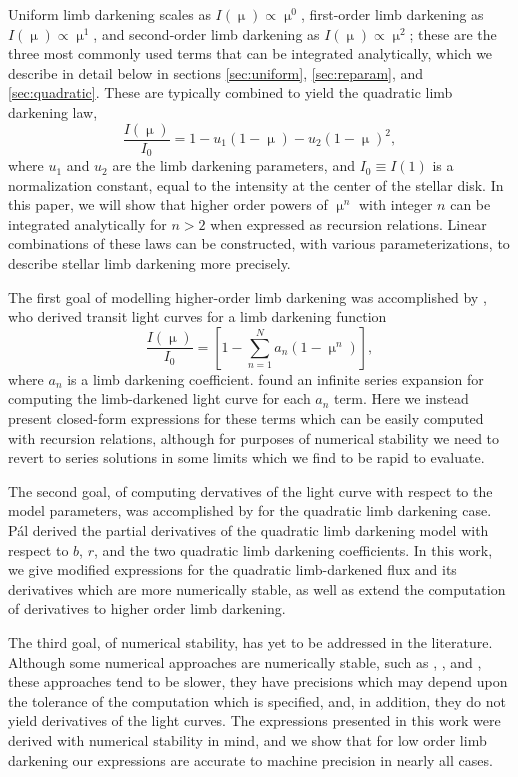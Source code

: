 \documentclass[modern]{aastex61}
\begin{document}
Uniform limb darkening scales as $I(\upmu) \propto \upmu^0$, first-order 
limb darkening as $I(\upmu) \propto \upmu^1$, and second-order limb darkening 
as $I(\upmu)\propto \upmu^2$; these are the three most commonly used  terms
that can be integrated analytically, which we describe in detail below 
in sections \ref{sec:uniform}, \ref{sec:reparam}, and \ref{sec:quadratic}.
These are typically combined to yield the quadratic limb darkening law,
%
\begin{equation} \label{eq:quadraticld}
    \frac{I(\upmu)}{I_0} = 1-u_1 (1-\upmu) - u_2 (1-\upmu)^2,
\end{equation}
%
where $u_1$ and $u_2$ are the limb darkening parameters, and
$I_0 \equiv I(1)$ is a normalization constant, equal to the 
intensity at the center of the stellar disk.
In this paper, we will show that higher order powers of $\upmu^n$ with integer
$n$ can be integrated analytically for $n > 2$ when expressed as recursion relations.
Linear combinations of these laws can be constructed,
with various parameterizations, to describe stellar limb darkening more precisely.

The first goal of modelling higher-order limb darkening was accomplished
by \citet{Gimenez2006}, who derived transit light curves for a limb darkening
function
%
\begin{equation} \label{eq:gimenez}
    \frac{I(\upmu)}{I_0} = \left[1-\sum_{n=1}^N a_n (1-\upmu^n) \right],
\end{equation}
%
where $a_n$ is a limb darkening coefficient.  \cite{Gimenez2006}
found an infinite series expansion for computing the limb-darkened light curve
for each $a_n$ term.  Here we instead present closed-form expressions for these terms
which can be easily computed with recursion relations, although for purposes
of numerical stability we need to revert to series solutions in some limits
which we find to be rapid to evaluate.

The second goal, of computing dervatives of the light curve with respect to
the model parameters, was accomplished by \cite{Pal2008} for the quadratic
limb darkening case.  P\'al derived the partial derivatives of the quadratic
limb darkening model with respect to $b$, $r$, and the two quadratic
limb darkening coefficients. In this work, we give modified expressions
for the quadratic limb-darkened flux and its derivatives which are
more numerically stable, as well as extend the computation of derivatives
to higher order limb darkening.

The third goal, of numerical stability, has yet to be addressed in the literature.
Although some numerical approaches are numerically stable, such as \cite{Gimenez2006},
\cite{Kreidberg2015}, and \cite{Parviainen2015}, these approaches tend to be 
slower, they have precisions which may depend upon the tolerance of the computation
which is specified, and, in addition, they do not yield derivatives of the light curves.
The expressions presented in this work were derived with numerical stability in
mind, and we show that for low order limb darkening our expressions are accurate
to machine precision in nearly all cases.
\end{document}
